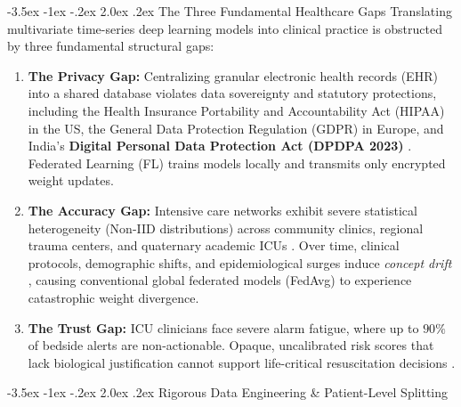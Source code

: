\documentclass[11pt, a4paper]{article}
\makeatletter
\renewcommand\section{\@startsection {section}{1}{\z@}%
                                   {-3.5ex \@plus -1ex \@minus -.2ex}%
                                   {2.0ex \@plus.2ex}%
                                   {\normalfont\large\bfseries\color{amritaMaroon}}}
\makeatother
\begin{document}
\section{The Three Fundamental Healthcare Gaps}
Translating multivariate time-series deep learning models into clinical practice is obstructed by three fundamental structural gaps:
\begin{enumerate}
    \item \textbf{The Privacy Gap:} Centralizing granular electronic health records (EHR) into a shared database violates data sovereignty and statutory protections, including the Health Insurance Portability and Accountability Act (HIPAA) in the US, the General Data Protection Regulation (GDPR) in Europe, and India's \textbf{Digital Personal Data Protection Act (DPDPA 2023)} \cite{rieke2020future,kaissis2020trustworthy}. Federated Learning (FL) \cite{mcmahan2017} trains models locally and transmits only encrypted weight updates.
    \item \textbf{The Accuracy Gap:} Intensive care networks exhibit severe statistical heterogeneity (Non-IID distributions) across community clinics, regional trauma centers, and quaternary academic ICUs \cite{yuan2024trend,wang2025personalized}. Over time, clinical protocols, demographic shifts, and epidemiological surges induce \textit{concept drift} \cite{jothimurugesan2022,bernardi2023adaptive}, causing conventional global federated models (FedAvg) to experience catastrophic weight divergence.
    \item \textbf{The Trust Gap:} ICU clinicians face severe alarm fatigue, where up to $90\%$ of bedside alerts are non-actionable. Opaque, uncalibrated risk scores that lack biological justification cannot support life-critical resuscitation decisions \cite{lundberg2018explainable,sundararajan2017axiomatic}.
\end{enumerate}

\section{Rigorous Data Engineering \& Patient-Level Splitting}
\end{document}
